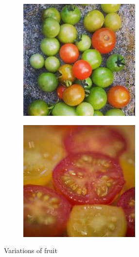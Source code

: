 \documentclass[../main.tex]{subfiles}
\begin{document}
\begin{figure}[h!]
\begin{subfigure}[b]{0.2\linewidth}
  \end{subfigure}
  \begin{subfigure}[b]{0.2\linewidth}
    \includegraphics[width=\linewidth]{01-img-variations/colored-tomatoes.png}
  \end{subfigure}
  \begin{subfigure}[b]{0.2\linewidth}
    \includegraphics[width=\linewidth]{01-img-variations/sliced-tomatoes.png}
  \end{subfigure}
  \caption{Variations of fruit}
  \label{fig:img-variations}
\end{figure}
\end{document}
